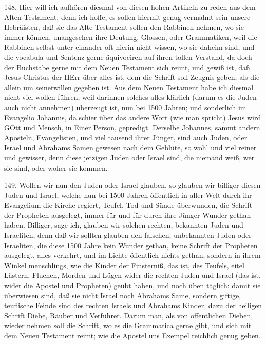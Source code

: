 148. Hier will ich aufhören diesmal von diesen hohen Artikeln zu reden aus dem Alten Testament, denn ich hoffe, es sollen hiermit genug vermahnt sein unsere Hebräisten, daß sie das Alte Testament sollen den Rabbinen nehmen, wo sie immer können, unangesehen ihre Deutung, Glossen, oder Grammatiken, weil die Rabbinen selbst unter einander oft hierin nicht wissen, wo sie daheim sind, und die vocabula und Sentenz gerne äquivociren auf ihren tollen Verstand, da doch der Buchstabe gerne mit dem Neuen Testament sich reimt, und gewiß ist, daß Jesus Christus der HErr über alles ist, dem die Schrift soll Zeugnis geben, als die allein um seinetwillen gegeben ist. Aus dem Neuen Testament habe ich diesmal nicht viel wollen führen, weil darinnen solches alles klärlich (darum es die Juden auch nicht annehmen) überzeugt ist, nun bei 1500 Jahren; und sonderlich im Evangelio Johannis, da schier über das andere Wort (wie man spricht) Jesus wird GOtt und Mensch, in Einer Person, gepredigt. Derselbe Johannes, sammt andern Aposteln, Evangelisten, und viel tausend ihrer Jünger, sind auch Juden, oder Israel und Abrahams Samen gewesen nach dem Geblüte, so wohl und viel reiner und gewisser, denn diese jetzigen Juden oder Israel sind, die niemand weiß, wer sie sind, oder woher sie kommen.

149. Wollen wir nun den Juden oder Israel glauben, so glauben wir billiger diesen Juden und Israel, welche nun bei 1500 Jahren öffentlich in aller Welt durch ihr Evangelium die Kirche regiert, Teufel, Tod und Sünde überwunden, die Schrift der Propheten ausgelegt, immer für und für durch ihre Jünger Wunder gethan haben. Billiger, sage ich, glauben wir solchen rechten, bekannten Juden und Israeliten, denn daß wir sollten glauben den falschen, unbekannten Juden oder Israeliten, die diese 1500 Jahre kein Wunder gethan, keine Schrift der Propheten ausgelegt, alles verkehrt, und im Lichte öffentlich nichts gethan, sondern in ihrem Winkel menschlings, wie die Kinder der Finsterniß, das ist, des Teufels, eitel Lästern, Fluchen, Morden und Lügen wider die rechten Juden und Israel (das ist, wider die Apostel und Propheten) geübt haben, und noch üben täglich: damit sie überwiesen sind, daß sie nicht Israel noch Abrahams Same, sondern giftige, teuflische Feinde sind des rechten Israels und Abrahams Kinder, dazu der heiligen Schrift Diebe, Räuber und Verführer. Darum man, als von öffentlichen Dieben, wieder nehmen soll die Schrift, wo es die Grammatica gerne gibt, und sich mit dem Neuen Testament reimt; wie die Apostel uns Exempel reichlich genug geben.

